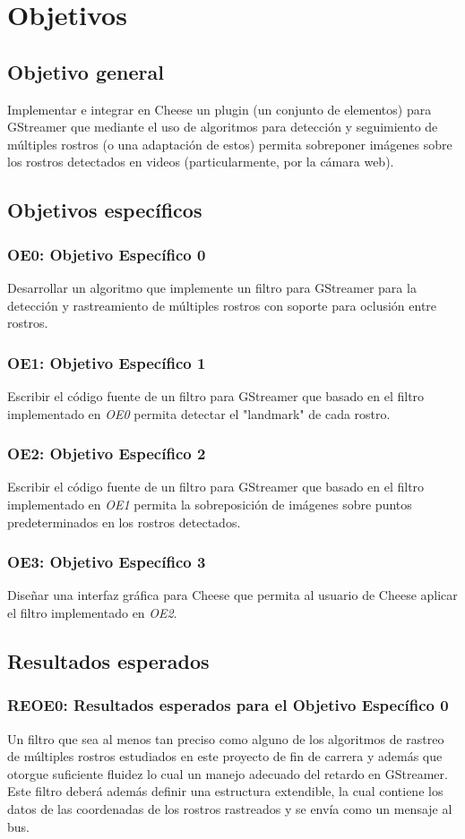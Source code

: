 \documentclass[a4paper,openright,12pt]{report}
\begin{document}
\section{Objetivos}
\subsection{Objetivo general}
Implementar e integrar en Cheese un plugin (un conjunto de elementos) para
GStreamer que mediante el uso de algoritmos para detección y seguimiento de
múltiples rostros (o una adaptación de estos) permita sobreponer imágenes sobre
los rostros detectados en videos (particularmente, por la cámara web).

\subsection{Objetivos específicos}
\subsubsection{OE0: Objetivo Específico 0}
Desarrollar un algoritmo que implemente un filtro para GStreamer para
la detección y rastreamiento de múltiples rostros con soporte para oclusión
entre rostros.
\subsubsection{OE1: Objetivo Específico 1}
Escribir el código fuente de un filtro para GStreamer que basado en el filtro
implementado en \textit{OE0} permita detectar el "landmark" de cada rostro.
\subsubsection{OE2: Objetivo Específico 2}
Escribir el código fuente de un filtro para GStreamer que basado en el filtro
implementado en \textit{OE1} permita la sobreposición de imágenes sobre puntos
predeterminados en los rostros detectados.
\subsubsection{OE3: Objetivo Específico 3}
Diseñar una interfaz gráfica para Cheese que permita al usuario de Cheese
aplicar el filtro implementado en \textit{OE2}.

\subsection{Resultados esperados}
\subsubsection{REOE0: Resultados esperados para el Objetivo Específico 0}
Un filtro que sea al menos tan preciso como alguno de los algoritmos de rastreo
de múltiples rostros estudiados en este proyecto de fin de carrera y
además que otorgue suficiente fluidez lo cual un manejo adecuado del retardo en
GStreamer. Este filtro deberá además definir una estructura extendible, la cual
contiene los datos de las coordenadas de los rostros rastreados y se envía como
un mensaje al bus.
\end{document}
